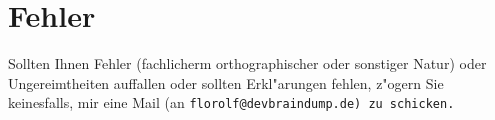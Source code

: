 \section{Fehler}
Sollten Ihnen Fehler (fachlicherm orthographischer oder sonstiger Natur) oder Ungereimtheiten auffallen oder sollten
Erkl"arungen fehlen, z"ogern Sie keinesfalls, mir eine Mail (an \tt{florolf@devbraindump.de}) zu schicken.
